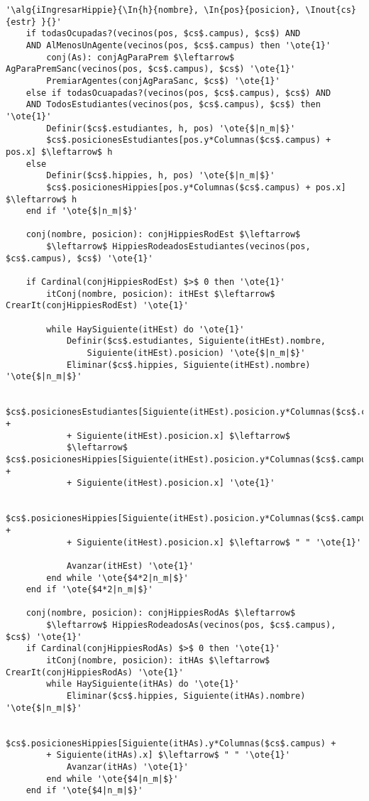 \begin{lstlisting}[mathescape]
'\alg{iIngresarHippie}{\In{h}{nombre}, \In{pos}{posicion}, \Inout{cs}{estr} }{}'
	if todasOcupadas?(vecinos(pos, $cs$.campus), $cs$) AND 
	AND AlMenosUnAgente(vecinos(pos, $cs$.campus) then '\ote{1}'
		conj(As): conjAgParaPrem $\leftarrow$ AgParaPremSanc(vecinos(pos, $cs$.campus), $cs$) '\ote{1}'
		PremiarAgentes(conjAgParaSanc, $cs$) '\ote{1}'
	else if todasOcuapadas?(vecinos(pos, $cs$.campus), $cs$) AND
	AND TodosEstudiantes(vecinos(pos, $cs$.campus), $cs$) then '\ote{1}'
		Definir($cs$.estudiantes, h, pos) '\ote{$|n_m|$}'
		$cs$.posicionesEstudiantes[pos.y*Columnas($cs$.campus) + pos.x] $\leftarrow$ h
	else
		Definir($cs$.hippies, h, pos) '\ote{$|n_m|$}'
		$cs$.posicionesHippies[pos.y*Columnas($cs$.campus) + pos.x] $\leftarrow$ h
	end if '\ote{$|n_m|$}'
	
	conj(nombre, posicion): conjHippiesRodEst $\leftarrow$ 
		$\leftarrow$ HippiesRodeadosEstudiantes(vecinos(pos, $cs$.campus), $cs$) '\ote{1}'

	if Cardinal(conjHippiesRodEst) $>$ 0 then '\ote{1}'
		itConj(nombre, posicion): itHEst $\leftarrow$ CrearIt(conjHippiesRodEst) '\ote{1}'
		
		while HaySiguiente(itHEst) do '\ote{1}'
			Definir($cs$.estudiantes, Siguiente(itHEst).nombre, 
				Siguiente(itHEst).posicion) '\ote{$|n_m|$}'
			Eliminar($cs$.hippies, Siguiente(itHEst).nombre) '\ote{$|n_m|$}'
			
			$cs$.posicionesEstudiantes[Siguiente(itHEst).posicion.y*Columnas($cs$.campus) + 
			+ Siguiente(itHEst).posicion.x] $\leftarrow$ 
			$\leftarrow$ $cs$.posicionesHippies[Siguiente(itHEst).posicion.y*Columnas($cs$.campus) + 
			+ Siguiente(itHest).posicion.x] '\ote{1}'
			
			$cs$.posicionesHippies[Siguiente(itHEst).posicion.y*Columnas($cs$.campus) + 
			+ Siguiente(itHest).posicion.x] $\leftarrow$ " " '\ote{1}'
			
			Avanzar(itHEst) '\ote{1}'
		end while '\ote{$4*2|n_m|$}'
	end if '\ote{$4*2|n_m|$}'

	conj(nombre, posicion): conjHippiesRodAs $\leftarrow$
		$\leftarrow$ HippiesRodeadosAs(vecinos(pos, $cs$.campus), $cs$) '\ote{1}'
	if Cardinal(conjHippiesRodAs) $>$ 0 then '\ote{1}'
		itConj(nombre, posicion): itHAs $\leftarrow$ CrearIt(conjHippiesRodAs) '\ote{1}'	
		while HaySiguiente(itHAs) do '\ote{1}'
			Eliminar($cs$.hippies, Siguiente(itHAs).nombre) '\ote{$|n_m|$}'
			
			$cs$.posicionesHippies[Siguiente(itHAs).y*Columnas($cs$.campus) +
		+ Siguiente(itHAs).x] $\leftarrow$ " " '\ote{1}'
			Avanzar(itHAs) '\ote{1}'
		end while '\ote{$4|n_m|$}'
	end if '\ote{$4|n_m|$}'


\end{lstlisting}
